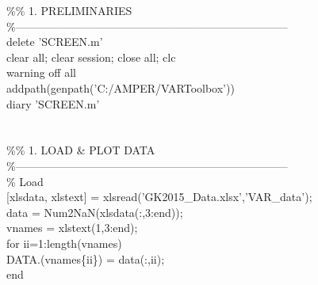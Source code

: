\hspace{1mm}\textcolor{matlabgreen}{\%}\textcolor{matlabgreen}{\% 1. PRELIMINARIES }\\ 
\hspace{1mm}\textcolor{matlabgreen}{\%--------------------------------------------------------------------------  }\\ 
\hspace{1mm}delete \textcolor{matlabpurple}{'SCREEN.m'}  \\ 
\hspace{1mm}clear all; clear session; close all; clc \\ 
\hspace{1mm}warning off all \\ 
\hspace{1mm}addpath(genpath(\textcolor{matlabpurple}{'C:/AMPER/VARToolbox'})) \\ 
\hspace{1mm}diary \textcolor{matlabpurple}{'SCREEN.m'} \\ 
\hspace{1mm} \\ 
\hspace{1mm} \\ 
\hspace{1mm}\textcolor{matlabgreen}{\%}\textcolor{matlabgreen}{\% 1. LOAD \& PLOT DATA }\\ 
\hspace{1mm}\textcolor{matlabgreen}{\%--------------------------------------------------------------------------  }\\ 
\hspace{1mm}\textcolor{matlabgreen}{\% Load  }\\ 
\hspace{1mm}[xlsdata, xlstext] = xlsread(\textcolor{matlabpurple}{'GK2015\_Data.xlsx'},\textcolor{matlabpurple}{'VAR\_data'}); \\ 
\hspace{1mm}data   = Num2NaN(xlsdata(:,3:end)); \\ 
\hspace{1mm}vnames = xlstext(1,3:end); \\ 
\hspace{1mm}\textcolor{matlabblue}{for} ii=1:length(vnames) \\ 
\hspace{1mm}\hspace{5mm} DATA.(vnames\{ii\}) = data(:,ii); \\ 
\hspace{1mm}\textcolor{matlabblue}{end} \\ 
